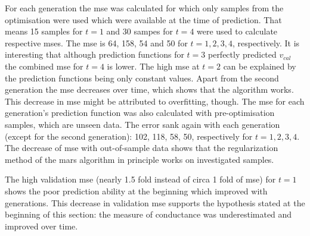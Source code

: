 For each generation the \gls{mse} was calculated for which only samples 
from the optimisation were used which were available at the time of prediction. 
That means 15 samples for $t=1$ and 30 sampes for $t=4$ were used to calculate respective \gls{mse}s. 
The \gls{mse} is 64, 158, 54 and 50 for $t=1,2,3,4$, respectively. 
It is interesting that although prediction functions for $t=3$ perfectly predicted $v_{cal}$ 
the combined \gls{mse} for $t=4$ is lower. 
The high \gls{mse} at $t=2$ can be explained by the prediction functions being only constant values. 
Apart from the second generation the \gls{mse} decreases  over time, 
which shows that the algorithm works. 
This decrease in \gls{mse} might be attributed to overfitting, though. 
The \gls{mse} for each generation's prediction function was also calculated with pre-optimisation samples, which are unseen data. 
The error sank again with each generation (except for the second generation): 102, 118, 58, 50, respectively for $t=1,2,3,4$. 
The decrease of \gls{mse} with out-of-sample data shows that the regularization method 
of the \gls{mars} algorithm in principle works on investigated samples. 

The high validation \gls{mse} (nearly 1.5 fold instead of circa 1 fold of \gls{mse}) 
for $t=1$ shows the poor prediction ability at the beginning which improved with generations.
This decrease in validation \gls{mse} supports the hypothesis stated at the beginning of this section: 
the measure of conductance was underestimated and improved over time.

